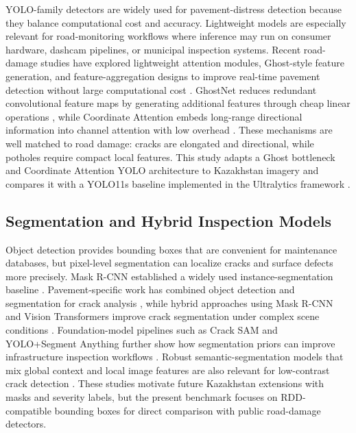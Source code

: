 \documentclass[applsci,article,submit,moreauthors]{Definitions/mdpi}
\begin{document}
YOLO-family detectors are widely used for pavement-distress detection because they balance computational cost and accuracy. Lightweight models are especially relevant for road-monitoring workflows where inference may run on consumer hardware, dashcam pipelines, or municipal inspection systems. Recent road-damage studies have explored lightweight attention modules, Ghost-style feature generation, and feature-aggregation designs to improve real-time pavement detection without large computational cost \cite{youwai2024yolo9tr,chen2024lagyolo,liu2025yoloattention}. GhostNet reduces redundant convolutional feature maps by generating additional features through cheap linear operations \cite{han2020ghostnet}, while Coordinate Attention embeds long-range directional information into channel attention with low overhead \cite{hou2021coordatt}. These mechanisms are well matched to road damage: cracks are elongated and directional, while potholes require compact local features. This study adapts a Ghost bottleneck and Coordinate Attention YOLO architecture to Kazakhstan imagery and compares it with a YOLO11s baseline implemented in the Ultralytics framework \cite{ultralytics2026}.

\subsection{Segmentation and Hybrid Inspection Models}

Object detection provides bounding boxes that are convenient for maintenance databases, but pixel-level segmentation can localize cracks and surface defects more precisely. Mask R-CNN established a widely used instance-segmentation baseline \cite{he2017maskrcnn}. Pavement-specific work has combined object detection and segmentation for crack analysis \cite{du2023pavement}, while hybrid approaches using Mask R-CNN and Vision Transformers improve crack segmentation under complex scene conditions \cite{alshawabkeh2025hybrid}. Foundation-model pipelines such as Crack SAM and YOLO+Segment Anything further show how segmentation priors can improve infrastructure inspection workflows \cite{rakshitha2024cracksam,cabral2025hybrid}. Robust semantic-segmentation models that mix global context and local image features are also relevant for low-contrast crack detection \cite{zhang2024semantic}. These studies motivate future Kazakhstan extensions with masks and severity labels, but the present benchmark focuses on RDD-compatible bounding boxes for direct comparison with public road-damage detectors.
\end{document}
